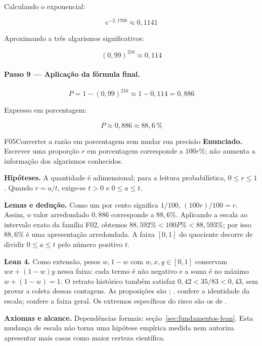 \begin{resultado}
Calculando o exponencial:

\[
e^{-2{,}1708} \approx 0{,}1141
\]

Aproximando a três algarismos significativos:

\[
(0{,}99)^{216} \approx 0{,}114
\]

\paragraph{Passo 9 — Aplicação da fórmula final.}

\[
P = 1-(0{,}99)^{216} \approx 1 - 0{,}114 = 0{,}886
\]

Expresso em porcentagem:

\[
\boxed{P \approx 0{,}886 \approx 88{,}6\,\%}
\]
\end{resultado}

\begin{formalizacao}{F05}{Converter a razão em porcentagem sem mudar sua precisão}
\textbf{Enunciado.} Escrever uma proporção $r$ em porcentagem corresponde a $100r\%$; não aumenta a informação dos algarismos conhecidos.

\textbf{Hipóteses.} A quantidade é adimensional; para a leitura probabilística, $0\leq r\leq1$. Quando $r=a/t$, exige-se $t>0$ e $0\leq a\leq t$.

\textbf{Lemas e dedução.} Como um por cento significa $1/100$, $(100r)/100=r$. Assim, o valor arredondado $0{,}886$ corresponde a $88{,}6\%$. Aplicando a escala ao intervalo exato da família F02, obtemos $88{,}592\%<100P\%<88{,}593\%$; por isso $88{,}6\%$ é uma apresentação arredondada. A faixa $[0,1]$ do quociente decorre de dividir $0\leq a\leq t$ pelo número positivo $t$.

\textbf{Lean 4.} Como extensão, pesos $w,1-w$ com $w,x,y\in[0,1]$ conservam $wx+(1-w)y$ nessa faixa: cada termo é não negativo e a soma é no máximo $w+(1-w)=1$. O retrato histórico também satisfaz $0{,}42<35/83<0{,}43$, sem provar a coleta dessas contagens. As proposições são ; .   confere a identidade da escala;  confere a faixa geral. Os extremos específicos do risco são os de .

\textbf{Axiomas e alcance.} Dependências formais: seção~\ref{sec:fundamentos-lean}. Esta mudança de escala não torna uma hipótese empírica medida nem autoriza apresentar mais casas como maior certeza científica.
\end{formalizacao}

